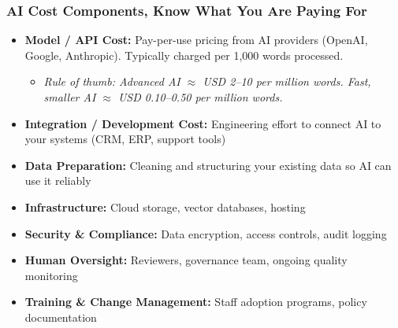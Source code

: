 \begin{frame}[fragile]\frametitle{AI Cost Components, Know What You Are Paying For}

\begin{itemize}
  \item \textbf{Model / API Cost:} Pay-per-use pricing from AI providers (OpenAI, Google, Anthropic). Typically charged per 1,000 words processed.
    \begin{itemize}
      \item \textit{Rule of thumb: Advanced AI $\approx$ USD 2--10 per million words. Fast, smaller AI $\approx$ USD 0.10--0.50 per million words.}
    \end{itemize}
  \item \textbf{Integration / Development Cost:} Engineering effort to connect AI to your systems (CRM, ERP, support tools)
  \item \textbf{Data Preparation:} Cleaning and structuring your existing data so AI can use it reliably
  \item \textbf{Infrastructure:} Cloud storage, vector databases, hosting
  \item \textbf{Security \& Compliance:} Data encryption, access controls, audit logging
  \item \textbf{Human Oversight:} Reviewers, governance team, ongoing quality monitoring
  \item \textbf{Training \& Change Management:} Staff adoption programs, policy documentation
\end{itemize}

\end{frame}

